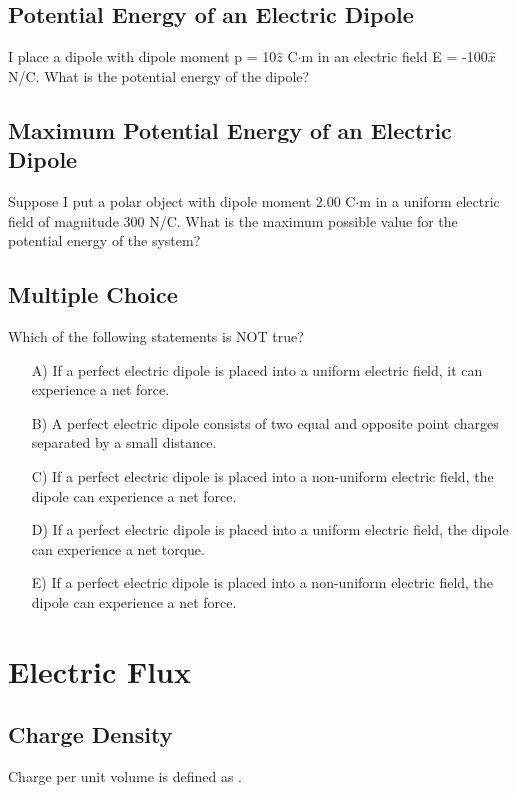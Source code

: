 \documentclass[11pt]{article}
\begin{document}
\subsection{Potential Energy of an Electric Dipole}
I place a dipole with dipole moment p = 10$\hat{z}$ C$\cdot$m in an electric field E = -100$\hat{x}$ N/C.  What is the potential energy of the dipole?

\subsection{Maximum Potential Energy of an Electric Dipole}
Suppose I put a polar object with dipole moment 2.00 C$\cdot$m in a uniform electric field of magnitude 300 N/C.  What is the maximum possible value for the potential energy of the system?

\subsection{Multiple Choice}
Which of the following statements is NOT true?

\begin{itemize}
	\item[A)] If a perfect electric dipole is placed into a uniform electric field, it can experience a net force.
	\item[B)] A perfect electric dipole consists of two equal and opposite point charges separated by a small distance.
	\item[C)] If a perfect electric dipole is placed into a non-uniform electric field, the dipole can experience a net force.
	\item[D)] If a perfect electric dipole is placed into a uniform electric field, the dipole can experience a net torque.
	\item[E)] If a perfect electric dipole is placed into a non-uniform electric field, the dipole can experience a net force.
\end{itemize}


\pagebreak
\section{Electric Flux}

\subsection{Charge Density}
Charge per unit volume is defined as \underline{\hspace{1cm}}.
\end{document}

